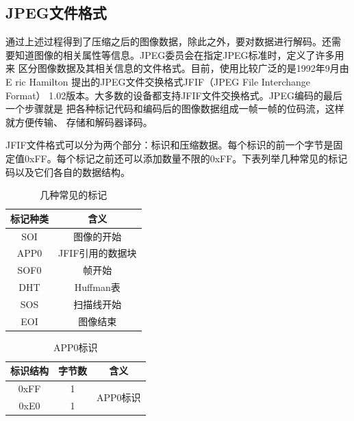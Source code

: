 \documentclass{article}
\numberwithin {equation}{section}
\begin{document}
\begin{spacing}{1.25}
  \subsection{JPEG文件格式}
    \vspace{1em}
    通过上述过程得到了压缩之后的图像数据，除此之外，要对数据进行解码。还需
    要知道图像的相关属性等信息。JPEG委员会在指定JPEG标准时，定义了许多用来
    区分图像数据及其相关信息的文件格式。目前，使用比较广泛的是1992年9月由E
    ric Hamilton 提出的JPEG文件交换格式JFIF（JPEG File Interchange Format）
    1.02版本。大多数的设备都支持JFIF文件交换格式。JPEG编码的最后一个步骤就是
    把各种标记代码和编码后的图像数据组成一帧一帧的位码流，这样就方便传输、
    存储和解码器译码。

    JFIF文件格式可以分为两个部分：标识和压缩数据。每个标识的前一个字节是固
    定值0xFF。每个标记之前还可以添加数量不限的0xFF。下表列举几种常见的标记
    码以及它们各自的数据结构。
    \begin{table}[H]
      \centering
      \caption{几种常见的标记}
      \begin{tabular}{cc}
        \toprule
        标记种类 & 含义\\
        \midrule
        SOI & 图像的开始\\
        APP0 & JFIF引用的数据块\\
        SOF0 & 帧开始\\
        DHT & Huffman表\\
        SOS & 扫描线开始\\
        EOI & 图像结束\\
        \bottomrule
      \end{tabular}
    \end{table}
    
    \begin{table}[H]
      \centering
      \caption{APP0标识}
      \begin{tabular}{ccc}
        \toprule
        标识结构 & 字节数 & 含义\\
        \midrule
        0xFF & 1 & \multirow{2}{*}{APP0标识}\\
        0xE0 & 1 &\\
        \bottomrule
      \end{tabular}
    \end{table}


\end{spacing}
\end{document}
